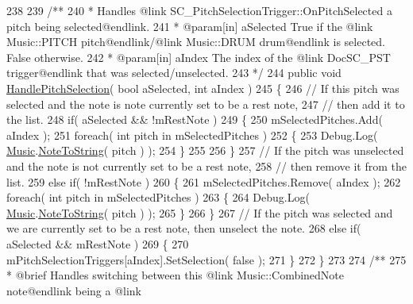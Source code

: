 \begin{DoxyCodeInclude}
238 \textcolor{comment}{}
239 \textcolor{comment}{    /**}
240 \textcolor{comment}{     * Handles @link SC\_PitchSelectionTrigger::OnPitchSelected a pitch being selected@endlink.}
241 \textcolor{comment}{     * @param[in] aSelected True if the @link Music::PITCH pitch@endlink/@link Music::DRUM drum@endlink is
       selected. False otherwise.}
242 \textcolor{comment}{     * @param[in] aIndex The index of the @link DocSC\_PST trigger@endlink that was selected/unselected.}
243 \textcolor{comment}{    */}
244     \textcolor{keyword}{public} \textcolor{keywordtype}{void} \hyperlink{group___s_c___p_s_c_handlers_gaa2afa8167100515d412cf751d9334f0c}{HandlePitchSelection}( \textcolor{keywordtype}{bool} aSelected, \textcolor{keywordtype}{int} aIndex )
245     \{
246         \textcolor{comment}{// If this pitch was selected and the note is note currently set to be a rest note,}
247         \textcolor{comment}{// then add it to the list.}
248         \textcolor{keywordflow}{if}( aSelected && !mRestNote )
249         \{
250             mSelectedPitches.Add( aIndex );
251             \textcolor{keywordflow}{foreach}( \textcolor{keywordtype}{int} pitch \textcolor{keywordflow}{in} mSelectedPitches )
252             \{
253                 Debug.Log( \hyperlink{class_music}{Music}.\hyperlink{group___music_stat_func_ga85a22c905d56d4c5f4e62159bfecee8c}{NoteToString}( pitch ) );
254             \}
255 
256         \}
257         \textcolor{comment}{// If the pitch was unselected and the note is not currently set to be a rest note, }
258         \textcolor{comment}{// then remove it from the list.}
259         \textcolor{keywordflow}{else} \textcolor{keywordflow}{if}( !mRestNote )
260         \{
261             mSelectedPitches.Remove( aIndex );
262             \textcolor{keywordflow}{foreach}( \textcolor{keywordtype}{int} pitch \textcolor{keywordflow}{in} mSelectedPitches )
263             \{
264                 Debug.Log( \hyperlink{class_music}{Music}.\hyperlink{group___music_stat_func_ga85a22c905d56d4c5f4e62159bfecee8c}{NoteToString}( pitch ) );
265             \}
266         \}
267         \textcolor{comment}{// If the pitch was selected and we are currently set to be a rest note, then unselect the note.}
268         \textcolor{keywordflow}{else} \textcolor{keywordflow}{if}( aSelected && mRestNote )
269         \{
270             mPitchSelectionTriggers[aIndex].SetSelection( \textcolor{keyword}{false} );
271         \}
272     \}
273 \textcolor{comment}{}
274 \textcolor{comment}{    /**}
275 \textcolor{comment}{     * @brief Handles switching between this @link Music::CombinedNote note@endlink being a @link
}
\end{DoxyCodeInclude}
